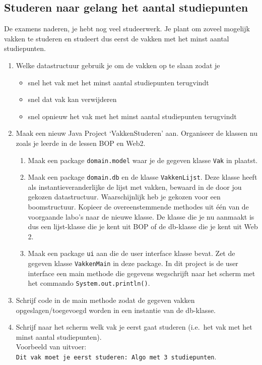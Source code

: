 \subsection*{Studeren naar gelang het aantal studiepunten}
De examens naderen, je hebt nog veel studeerwerk. Je plant om zoveel mogelijk vakken te studeren en studeert dus eerst de vakken met het minst aantal studiepunten.
\begin{enumerate}
\item Welke datastructuur gebruik je om de vakken op te slaan zodat je
\begin{itemize}
\item  snel het vak  met het minst aantal studiepunten  terugvindt
\item snel dat vak kan verwijderen
\item snel opnieuw het vak met het minst aantal studiepunten terugvindt
\end{itemize}
\item Maak een nieuw Java Project `VakkenStuderen' aan. Organiseer de klassen nu zoals je leerde in de lessen BOP en Web2. 
\begin{enumerate}
\item Maak een package \verb/domain.model/ waar je de gegeven klasse \verb/Vak/ in plaatst.
\item Maak een package \verb/domain.db/ en de klasse \verb/VakkenLijst/. Deze klasse heeft als instantieveranderlijke de lijst met vakken, bewaard  in de door jou gekozen datastructuur. Waarschijnlijk heb je gekozen voor een boomstructuur. Kopieer de overeenstemmende methodes uit één van de voorgaande labo's naar de nieuwe klasse. De klasse die je nu aanmaakt is dus een lijst-klasse die je kent uit BOP of de db-klasse die je kent uit Web 2.
\item Maak een package \verb/ui/ aan die de user interface klasse bevat. Zet de gegeven klasse \verb/VakkenMain/ in deze package.  In dit project is de user interface een main methode die gegevens wegschrijft naar het scherm met het commando \verb/System.out.println()/. 
\end{enumerate}
\item Schrijf code in de main methode zodat de gegeven vakken opgeslagen/toegevoegd worden in een instantie van de db-klasse. 
\item \label{scherm} Schrijf naar het scherm welk vak je eerst gaat studeren (i.e.\ het vak met het minst aantal studiepunten). \\Voorbeeld van uitvoer: \\ \verb/Dit vak moet je eerst studeren: Algo met 3 studiepunten/.

\end{enumerate}

